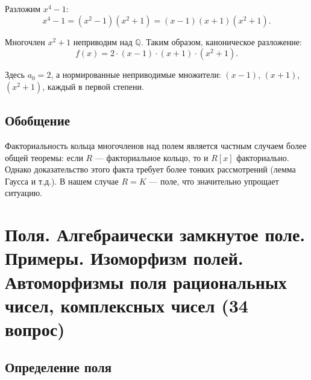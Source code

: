 \documentclass[a4paper,12pt]{article}
\theoremstyle{definition}
\theoremstyle{plain}
\theoremstyle{remark}
\begin{document}
	Разложим \( x^4 - 1 \):
	\[
	x^4 - 1 = (x^2 - 1)(x^2 + 1) = (x - 1)(x + 1)(x^2 + 1).
	\]
	
	Многочлен \( x^2 + 1 \) неприводим над \( \mathbb{Q} \). Таким образом, каноническое разложение:
	\[
	f(x) = 2 \cdot (x - 1) \cdot (x + 1) \cdot (x^2 + 1).
	\]
	
	Здесь \( a_0 = 2 \), а нормированные неприводимые множители: \( (x - 1) \), \( (x + 1) \), \( (x^2 + 1) \), каждый в первой степени.
	
	\subsection{Обобщение}
	
	Факториальность кольца многочленов над полем является частным случаем более общей теоремы: если \( R \) — факториальное кольцо, то и \( R[x] \) факториально. Однако доказательство этого факта требует более тонких рассмотрений (лемма Гаусса и т.д.). В нашем случае \( R = K \) — поле, что значительно упрощает ситуацию.
	
	
	
	
	
	\newpage
	\section{Поля. Алгебраически замкнутое поле. Примеры. Изоморфизм полей. Автоморфизмы поля рациональных чисел, комплексных чисел (34 вопрос)}
	
	\subsection{Определение поля}
	
\end{document}
